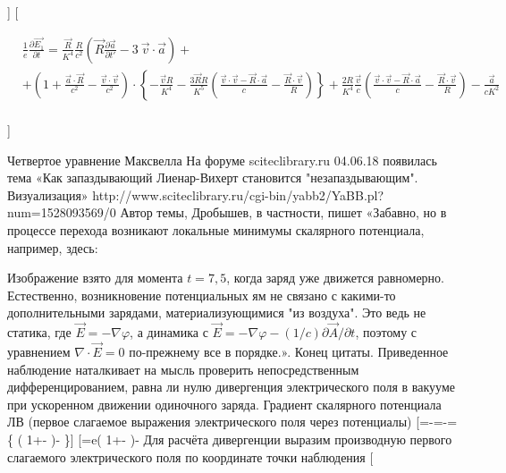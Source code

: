 \documentclass[11pt]{article}
\begin{document}
{]} {[}

\begin{align}
  & \frac{1}{e}\frac{\partial \overrightarrow{{{E}_{1}}}}{\partial t}=\frac{\overrightarrow{R}}{{{K}^{4}}}\frac{R}{{{c}^{2}}}\left( \overrightarrow{R}\frac{\partial \overrightarrow{a}}{\partial t'}-3\ \overrightarrow{v}\cdot \overrightarrow{a} \right)+ \\ 
 & +\left( 1+\frac{\overrightarrow{a}\cdot \overrightarrow{R}}{{{c}^{2}}}-\frac{\overrightarrow{v}\cdot \overrightarrow{v}}{{{c}^{2}}} \right)\cdot \left\{ -\frac{\overrightarrow{v}R}{{{K}^{4}}}-\frac{3\overrightarrow{R}R}{{{K}^{5}}}\left( \frac{\overrightarrow{v}\cdot \overrightarrow{v}-\overrightarrow{R}\cdot \overrightarrow{a}}{c}-\frac{\overrightarrow{R}\cdot \overrightarrow{v}}{R} \right) \right\}+\frac{2R}{{{K}^{4}}}\frac{\overrightarrow{v}}{c}\left( \frac{\overrightarrow{v}\cdot \overrightarrow{v}-\overrightarrow{R}\cdot \overrightarrow{a}}{c}-\frac{\overrightarrow{R}\cdot \overrightarrow{v}}{R} \right)-\frac{\overrightarrow{a}}{c{{K}^{2}}} \\ 
\end{align}

{]}

Четвертое уравнение Максвелла На форуме sciteclibrary.ru 04.06.18
появилась тема «Как запаздывающий Лиенар-Вихерт становится
"незапаздывающим". Визуализация»
http://www.sciteclibrary.ru/cgi-bin/yabb2/YaBB.pl?num=1528093569/0 Автор
темы, Дробышев, в частности, пишет «Забавно, но в процессе перехода
возникают локальные минимумы скалярного потенциала, например, здесь:

Изображение взято для момента \(t=7{,}5\), когда заряд уже движется
равномерно. Естественно, возникновение потенциальных ям не связано с
какими-то дополнительными зарядами, материализующимися "из воздуха". Это
ведь не статика, где \(\vec{E}=-\nabla \varphi\), а динамика с
\(\vec{E}=-\nabla \varphi -(1/c)\partial\vec{A}/ \partial t\), поэтому с
уравнением \(\nabla\cdot\vec{E}=0\) по-прежнему все в порядке.». Конец
цитаты. Приведенное наблюдение наталкивает на мысль проверить
непосредственным дифференцированием, равна ли нулю дивергенция
электрического поля в вакууме при ускоренном движении одиночного заряда.
Градиент скалярного потенциала ЛВ (первое слагаемое выражения
электрического поля через потенциалы)
{[}=-\nabla \varphi =-\nabla {}=\left\{
\left(
1+-
\right)- \right\}{]}
{[}=e\left(
1+-
\right)-\frac{\overrightarrow{v}}{c}{]} Для расчёта
дивергенции выразим производную первого слагаемого электрического поля
по координате точки наблюдения {[}
\end{document}
